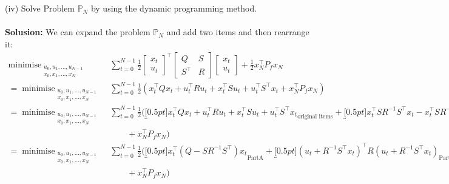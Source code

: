 \documentclass[a4paper,11pt,reqno]{amsart}
\newcommand{\tran}{\intercal}
\DeclareMathOperator*{\minimise}{minimise}
\begin{document}
\
\\ \\
(iv) Solve Problem $\mathbb{P}_N$ by using the dynamic programming method.
\\ \\
\textbf{Solusion:}
We can expand the problem $\mathbb{P}_N$ and add two items and then rearrange it:
\begin{align}
    \minimise_{\substack{u_0,u_1,\ldots,u_{N-1}\\ x_0,x_1,\ldots,x_N}} \,
    & \sum_{t=0}^{N-1}\textstyle\frac{1}{2}
    \begin{bmatrix}
        x_t\\
        u_t
    \end{bmatrix}^{\tran}
    \begin{bmatrix}
        Q&S\\
        S^{\tran}&R
    \end{bmatrix}
    \begin{bmatrix}
        x_t\\
        u_t
    \end{bmatrix}+\tfrac{1}{2}x_N^{\tran}P_fx_N
    \\
    =\minimise_{\substack{u_0,u_1,\ldots,u_{N-1}\\ x_0,x_1,\ldots,x_N}} \,
    &\sum_{t=0}^{N-1}\textstyle\frac{1}{2}
    (x_t^{\tran}Qx_t+u_t^{\tran}Ru_t+x_t^{\tran}Su_t+u_t^{\tran}S^{\tran}x_t
    +x_N^{\tran}P_fx_N)
    \\
    =\minimise_{\substack{u_0,u_1,\ldots,u_{N-1}\\ x_0,x_1,\ldots,x_N}} \,
    &\sum_{t=0}^{N-1}\textstyle\frac{1}{2}
    (\underbracket[0.5pt]{x_t^{\tran}Qx_t+u_t^{\tran}Ru_t+x_t^{\tran}Su_t+u_t^{\tran}S^{\tran}x_t}_{\text{original items}}
    +\underbracket[0.5pt]{x_t^{\tran}SR^{-1}S^{\tran}x_t-x_t^{\tran}SR^{-1}S^{\tran}x_t}_{\text{added items}}
    \\
    &\qquad+x_N^{\tran}P_fx_N)
    \\
    =\minimise_{\substack{u_0,u_1,\ldots,u_{N-1}\\ x_0,x_1,\ldots,x_N}} \,
    &\sum_{t=0}^{N-1}\textstyle\frac{1}{2}
    (\underbracket[0.5pt]{x_t^{\tran}(Q-SR^{-1}S^{\tran})x_t}_{\text{PartA}}+\underbracket[0.5pt]{(u_t+R^{-1}S^{\tran}x_t)^{\tran}R(u_t+R^{-1}S^{\tran}x_t)}_{\text{PartB}}
    \\
    &\qquad+x_N^{\tran}P_fx_N)
    \label{eq:P_N_matrix_rewrite}
\end{align}
\end{document}
